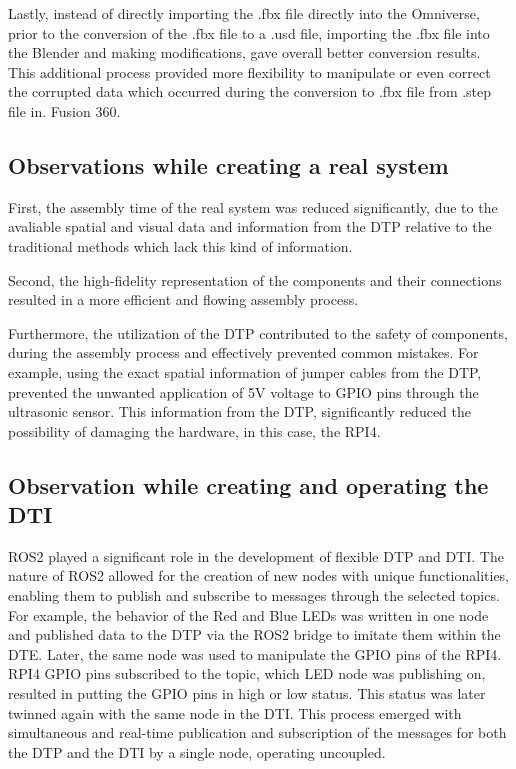 \documentclass[conference]{IEEEtran}
\begin{document}
    Lastly, instead of directly importing the .fbx file directly into the Omniverse, prior to the conversion of the .fbx file to a .usd file, 
    importing the .fbx file into the Blender and making modifications, gave overall better conversion results. This additional process provided more flexibility to manipulate or even correct 
    the corrupted data which occurred during the conversion to .fbx file from .step file in. Fusion 360.

    \subsection{Observations while creating a real system}

    First, the assembly time of the real system was reduced significantly, 
    due to the avaliable spatial and visual data and information from the DTP relative to the traditional methods which lack this kind of information.

    Second, the high-fidelity representation of the components and their connections resulted in a more efficient and flowing assembly process. 

    Furthermore, the utilization of the DTP contributed to the safety of components, during the assembly process and effectively prevented common mistakes. For example, using the exact spatial information of jumper cables from the DTP, prevented the unwanted application of 5V  voltage to GPIO pins through the ultrasonic sensor. This information from the DTP, significantly reduced the possibility of damaging the hardware, in this case, the RPI4. 

    \subsection{Observation while creating and operating the DTI}

    ROS2 played a significant role in the development of flexible DTP and DTI. The nature of  ROS2 allowed for the creation of new nodes with unique functionalities, 
    enabling them to publish and subscribe to messages through the selected topics. For example, the behavior of the Red and Blue LEDs was written in one node and published data to the DTP via 
    the ROS2 bridge to imitate them within the DTE. Later, the same node was used to manipulate the GPIO pins of the RPI4. RPI4 GPIO pins subscribed to the topic, which 
    LED node was publishing on, resulted in putting the GPIO pins in high or low status. This status was later twinned again with the same node in the DTI. 
    This process emerged with simultaneous and real-time publication and subscription of the messages for both the DTP and the DTI by a single node, operating uncoupled.
    
\end{document}
